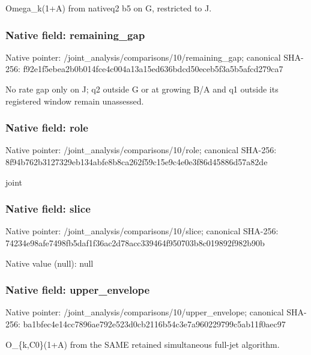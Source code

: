 \documentclass[10pt,a4paper]{article}
\begin{document}
\begingroup\raggedright\sloppy Omega\_\allowbreak{}k(1+A) from nativeq2 b5 on G,\allowbreak{} restricted to J.\par\endgroup

\subsubsection{Native field: remaining\_\allowbreak{}gap}
Native pointer: /joint\_\allowbreak{}analysis/comparisons/10/remaining\_\allowbreak{}gap; canonical SHA-256: f92e1f5ebea2b0b014fce4c004a13a15ed636bdcd50eceb5f3a5b5afcd279ca7

\begingroup\raggedright\sloppy No rate gap only on J;\allowbreak{} q2 outside G or at growing B/\allowbreak{}A and q1 outside its registered window remain unassessed.\par\endgroup

\subsubsection{Native field: role}
Native pointer: /joint\_\allowbreak{}analysis/comparisons/10/role; canonical SHA-256: 8f94b762b3127329eb134abfe8b8ca262f59c15e9c4e0e3f86d45886d57a82de

\begingroup\raggedright\sloppy joint\par\endgroup

\subsubsection{Native field: slice}
Native pointer: /joint\_\allowbreak{}analysis/comparisons/10/slice; canonical SHA-256: 74234e98afe7498fb5daf1f36ac2d78acc339464f950703b8c019892f982b90b

Native value (null): null

\subsubsection{Native field: upper\_\allowbreak{}envelope}
Native pointer: /joint\_\allowbreak{}analysis/comparisons/10/upper\_\allowbreak{}envelope; canonical SHA-256: ba1bfec4e14cc7896ae792e523d0cb2116b54c3e7a960229799c5ab11f0aec97

\begingroup\raggedright\sloppy O\_\allowbreak{}\{k,\allowbreak{}C0\}(1+A) from the SAME retained simultaneous full-jet algorithm.\par\endgroup
\end{document}
